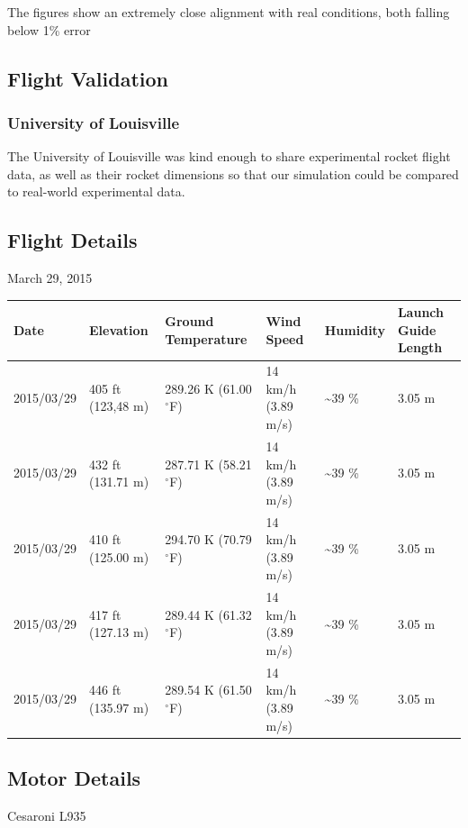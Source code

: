 \documentclass[]{article}
\begin{document}
The figures show an extremely close alignment with real conditions, both
falling below 1\% error

\subsection{Flight Validation}\label{flight-validation}

\subsubsection{University of Louisville}\label{university-of-louisville}

The University of Louisville was kind enough to share experimental
rocket flight data, as well as their rocket dimensions so that our
simulation could be compared to real-world experimental data.

\subsection{Flight Details}\label{flight-details}

March 29, 2015

\begin{longtable}[c]{@{}llllll@{}}
\toprule
Date & Elevation & Ground Temperature & Wind Speed & Humidity & Launch
Guide Length\tabularnewline
\midrule
\endhead
2015/03/29 & 405 ft (123,48 m) & 289.26 K (61.00 \(^\circ\)F) & 14 km/h
(3.89 m/s) & \textasciitilde{}39 \% & 3.05 m\tabularnewline
2015/03/29 & 432 ft (131.71 m) & 287.71 K (58.21 \(^\circ\)F) & 14 km/h
(3.89 m/s) & \textasciitilde{}39 \% & 3.05 m\tabularnewline
2015/03/29 & 410 ft (125.00 m) & 294.70 K (70.79 \(^\circ\)F) & 14 km/h
(3.89 m/s) & \textasciitilde{}39 \% & 3.05 m\tabularnewline
2015/03/29 & 417 ft (127.13 m) & 289.44 K (61.32 \(^\circ\)F) & 14 km/h
(3.89 m/s) & \textasciitilde{}39 \% & 3.05 m\tabularnewline
2015/03/29 & 446 ft (135.97 m) & 289.54 K (61.50 \(^\circ\)F) & 14 km/h
(3.89 m/s) & \textasciitilde{}39 \% & 3.05 m\tabularnewline
\bottomrule
\end{longtable}

\subsection{Motor Details}\label{motor-details}

Cesaroni L935
\end{document}
